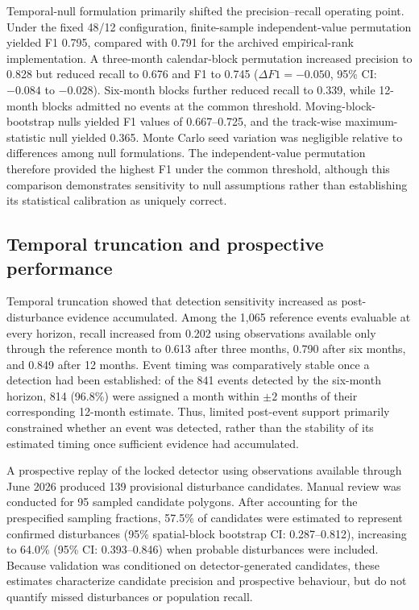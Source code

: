 Temporal-null formulation primarily shifted the precision--recall operating point. Under the fixed 48/12 configuration, finite-sample independent-value permutation yielded F1 0.795, compared with 0.791 for the archived empirical-rank implementation. A three-month calendar-block permutation increased precision to 0.828 but reduced recall to 0.676 and F1 to 0.745 ($\Delta F1=-0.050$, 95\% CI: $-0.084$ to $-0.028$). Six-month blocks further reduced recall to 0.339, while 12-month blocks admitted no events at the common threshold. Moving-block-bootstrap nulls yielded F1 values of 0.667--0.725, and the track-wise maximum-statistic null yielded 0.365. Monte Carlo seed variation was negligible relative to differences among null formulations. The independent-value permutation therefore provided the highest F1 under the common threshold, although this comparison demonstrates sensitivity to null assumptions rather than establishing its statistical calibration as uniquely correct.


\subsection{Temporal truncation and prospective performance}
\label{sec:temporal_prospective_results}

Temporal truncation showed that detection sensitivity increased as post-disturbance evidence accumulated. Among the 1,065 reference events evaluable at every horizon, recall increased from 0.202 using observations available only through the reference month to 0.613 after three months, 0.790 after six months, and 0.849 after 12 months. Event timing was comparatively stable once a detection had been established: of the 841 events detected by the six-month horizon, 814 (96.8\%) were assigned a month within $\pm2$ months of their corresponding 12-month estimate. Thus, limited post-event support primarily constrained whether an event was detected, rather than the stability of its estimated timing once sufficient evidence had accumulated.

A prospective replay of the locked detector using observations available through June 2026 produced 139 provisional disturbance candidates. Manual review was conducted for 95 sampled candidate polygons. After accounting for the prespecified sampling fractions, 57.5\% of candidates were estimated to represent confirmed disturbances (95\% spatial-block bootstrap CI: 0.287--0.812), increasing to 64.0\% (95\% CI: 0.393--0.846) when probable disturbances were included. Because validation was conditioned on detector-generated candidates, these estimates characterize candidate precision and prospective behaviour, but do not quantify missed disturbances or population recall.

